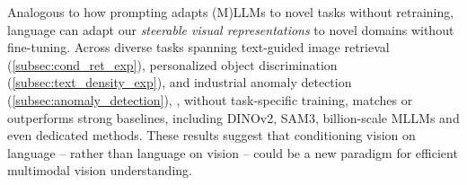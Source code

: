 Analogous to how prompting adapts (M)LLMs to novel tasks without retraining, language can adapt our \textit{steerable visual representations} to novel domains without fine-tuning.
Across diverse tasks spanning text-guided image retrieval (\cref{subsec:cond_ret_exp}), personalized object discrimination (\cref{subsec:text_density_exp}), and industrial anomaly detection (\cref{subsec:anomaly_detection}),
\model{}, without task-specific training, matches or outperforms strong baselines, including DINOv2, SAM3, billion-scale MLLMs and even dedicated methods.
These results suggest that conditioning vision on language -- rather than language on vision -- could be a new paradigm for efficient multimodal vision understanding.




